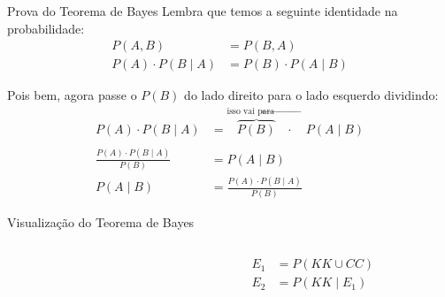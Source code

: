 \begin{frame}{Prova do Teorema de Bayes}
	Lembra que temos a seguinte identidade na probabilidade:
	$$
		\begin{aligned}
			P(A,B)                 & = P(B,A)                 \\
			P(A) \cdot P(B \mid A) & = P(B) \cdot P(A \mid B)
		\end{aligned}
	$$

	Pois bem, agora passe o $P(B)$ do lado direito para o lado esquerdo dividindo:
	$$
		\begin{aligned}
			P(A) \cdot P(B \mid A)              & = \overbrace{P(B)}^{\text{isso vai para $\leftarrow$}} \cdot \quad P(A \mid B) \\
			                                    &                                                                                \\
			\frac{P(A) \cdot P(B \mid A)}{P(B)} & = P(A \mid B)                                                                  \\
			P(A \mid B)                         & = \frac{P(A) \cdot P(B \mid A)}{P(B)}
		\end{aligned}
	$$
\end{frame}

\begin{frame}{Visualização do Teorema de Bayes}
	\begin{columns}
		\begin{column}{0.6\textwidth}
		\end{column}
		\begin{column}{0.4\textwidth}
			$$
				\begin{aligned}
					E_1 & = P(KK  \cup CC) \\
					E_2 & = P(KK \mid E_1)
				\end{aligned}
			$$
		\end{column}
	\end{columns}
\end{frame}

